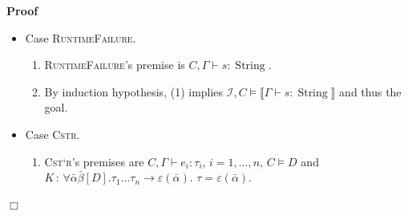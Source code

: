 \documentclass{article}
\newcommand{\colons}{\,:\,}
\newcommand{\tmname}[1]{\textsc{#1}}
\newcommand{\tmop}[1]{\ensuremath{\operatorname{#1}}}
\newcommand{\tmstrong}[1]{\textbf{#1}}
\newenvironment{proof}{\noindent\textbf{Proof\ }}{\hspace*{\fill}$\Box$\medskip}
\begin{document}
\begin{proof}
\begin{itemize}
\begin{enumerate}
      \item By induction hypothesis and weakening, (1) and (2) imply
      $\mathcal{I}_i, C \wedge \alpha^1 \dot{=} \tau_1 \wedge \alpha^2 \dot{=}
      \tau_2 \wedge \alpha^1 \dot{=} \alpha^2 \vDash \Phi_i$ for $\Phi_i =
      \left\llbracket \Gamma \vdash e_i : {\nobreak} \alpha^i
      \right\rrbracket$, $i = 1, 2$, $\Phi_3 = \llbracket \Gamma \vdash e_3 :
      \tau \rrbracket$.
      
      \item By (2) and nonemptiness of sorts, we have $C \vDash \exists
      \alpha^1 \alpha^2 . (C \wedge \alpha^1 \dot{=} \tau_1 \wedge \alpha^2
      \dot{=} \tau_2 \wedge \alpha^1 \dot{=} \alpha^2)$.
      
      \item By (3), the premise and because $C \vDash D$ implies $\exists
      \alpha .C \vDash \exists \alpha .D$, we have $\mathcal{I}_1
      \mathcal{I}_2 \mathcal{I}_3, \exists \alpha^1 \alpha^2 . (C \wedge
      \alpha^1 \dot{=} \tau_1 \wedge \alpha^2 \dot{=} \tau_2 \wedge \alpha^1
      \dot{=} \alpha^2) \vDash \exists \alpha . (\Phi_1 \wedge \Phi_2 \wedge
      \Phi_3)$.
      
      \item By (4) and (5), we have the goal $\mathcal{I}, C \vDash
      \left\llbracket \Gamma \vdash \text{{\tmstrong{assert type}}} e_1 = e_2
      ; e_3 : \tau \right\rrbracket$ with $\mathcal{I}=\mathcal{I}_1
      \mathcal{I}_2 \mathcal{I}_3$.
    \end{enumerate}
    \item Case {\tmname{RuntimeFailure}}.
    \begin{enumerate}
      \item {\tmname{RuntimeFailure}}'s premise is $C, \Gamma \vdash s :
      \tmop{String}$.
      
      \item By induction hypothesis, (1) implies $\mathcal{I}, C \vDash
      \llbracket \Gamma \vdash s : \tmop{String} \rrbracket$ and thus the
      goal.
    \end{enumerate}
    \item Case {\tmname{Cstr}}.
    \begin{enumerate}
      \item {\tmname{Cst`r}}'s premises are $C, \Gamma \vdash e_i : \tau_i$,
      $i = 1, \ldots, n$, $C \vDash D$ and $K \colons \forall \bar{\alpha}
      \bar{\beta} [D] . \tau_1 \ldots \tau_n \rightarrow \varepsilon
      (\bar{\alpha})$. $\tau = \varepsilon (\bar{\alpha})$.
      

\end{enumerate}
\end{itemize}
\end{proof}
\end{document}
